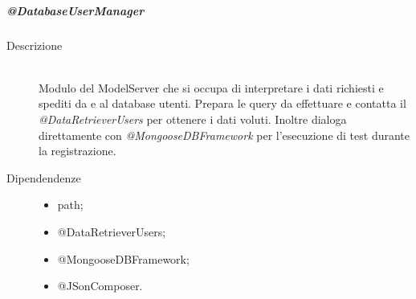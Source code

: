 \subparagraph{@DatabaseUserManager}
\begin{description}
 \item[Descrizione] \hfill \\
Modulo del ModelServer che si occupa di interpretare i dati richiesti e spediti da e al database utenti. 
Prepara le query da effettuare e contatta il \textit{@DataRetrieverUsers} per ottenere i dati voluti. 
Inoltre dialoga direttamente con \textit{@MongooseDBFramework} per l'esecuzione di test durante la registrazione. 
 \item[Dipendendenze] \hfill
 \begin{itemize}
  \item path;
  \item @DataRetrieverUsers;
  \item @MongooseDBFramework;
  \item @JSonComposer.
 \end{itemize}
  

\end{description}
